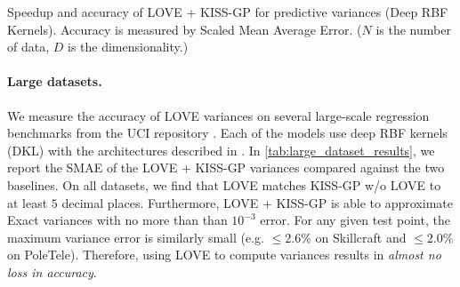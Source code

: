 \begin{table}[t!]
  \caption[Speedup and accuracy of LOVE + KISS-GP{} for predictive variances.]{
    Speedup and accuracy of LOVE + KISS-GP{} for predictive variances (Deep RBF Kernels).
    Accuracy is measured by Scaled Mean Average Error.
    ($N$ is the number of data, $D$ is the dimensionality.)
    \label{tab:large_dataset_results}
  }
  \vspace{0.5ex}
  \centering
  \resizebox{\textwidth}{!}{%
    
  }
  \vspace{1em}

  \resizebox{\textwidth}{!}{%
    
  }
\end{table}

\paragraph{Large datasets.}
We measure the accuracy of LOVE{} variances on several large-scale regression benchmarks from the UCI repository \cite{asuncion2007uci}.
Each of the models use deep RBF kernels (DKL) with the architectures described in \cite{wilson2016deep}.
In \cref{tab:large_dataset_results}, we report the SMAE of the LOVE + KISS-GP{} variances compared against the two baselines.
On all datasets, we find that LOVE{} matches KISS-GP w/o LOVE{} to at least $5$ decimal places.
Furthermore, LOVE + KISS-GP{} is able to approximate Exact variances with no more than than $10^{-3}$ error.
For any given test point, the maximum variance error is similarly small (e.g. $\leq \! 2.6\%$ on Skillcraft and $\leq \! 2.0\%$ on PoleTele).
Therefore, using LOVE{} to compute variances results in \emph{almost no loss in accuracy}.

